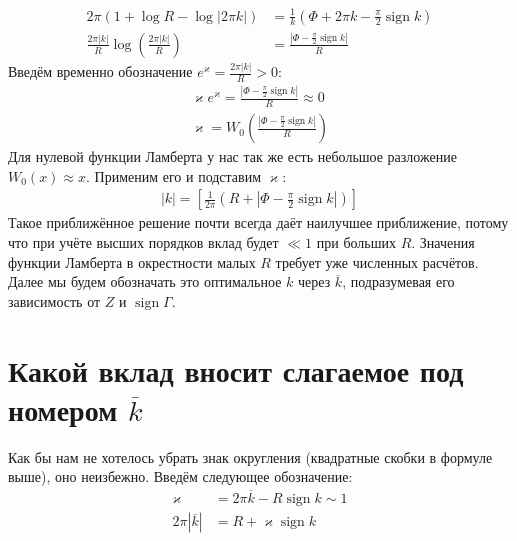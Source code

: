 \documentclass[a4paper, 12pt]{article}
\DeclareMathOperator*{\sign}{sign}
\begin{document}
\begin{equation}
\begin{aligned}
    2\pi\left(1+\log R - \log|2\pi k|\right) &= \frac{1}{k}\left(\Phi + 2\pi k - \frac{\pi}{2}\sign k\right)\\
    \frac{2\pi |k|}{R}\log\left(\frac{2\pi |k|}{R}\right) &= \frac{\left|\Phi - \frac{\pi}{2}\sign k\right|}{R}
\end{aligned}
\end{equation}
Введём временно обозначение $e^\varkappa = \frac{2\pi |k|}{R} > 0$:
\begin{equation}
\begin{aligned}
    \varkappa e^{\varkappa} = \frac{\left|\Phi - \frac{\pi}{2}\sign k\right|}{R}\approx 0\\
    \varkappa = W_0\left(\frac{\left|\Phi - \frac{\pi}{2}\sign k\right|}{R}\right)
\end{aligned}
\end{equation}
Для нулевой функции Ламберта у нас так же есть небольшое разложение $W_0(x)\approx x$. Применим его и подставим $\varkappa$:
\begin{equation}
\begin{aligned}
    |k|= \left[ \frac{1}{2\pi}\left(R + \left|\Phi - \frac{\pi}{2}\sign k\right|\right)\right]
\end{aligned}
\end{equation}
Такое приближённое решение почти всегда даёт наилучшее приближение, потому что при учёте высших порядков вклад будет $\ll 1$ при больших $R$. Значения функции Ламберта в окрестности малых $R$ требует уже численных расчётов. Далее мы будем обозначать это оптимальное $k$ через $\overline k$, подразумевая его зависимость от $Z$ и $\sign \Gamma$.

\section*{Какой вклад вносит слагаемое под номером $\overline{k}$}
Как бы нам не хотелось убрать знак округления (квадратные скобки в формуле выше), оно неизбежно. Введём следующее обозначение:
\begin{equation}
\begin{aligned}
    \varkappa &= 2\pi \overline{k} - R\sign k\sim 1\\
    2\pi |\overline{k}| &= R + \varkappa \sign k
\end{aligned}
\end{equation}
\end{document}
